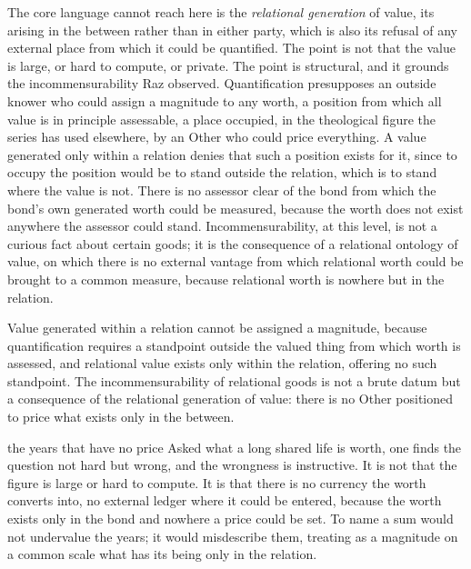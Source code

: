 The core language cannot reach here is the \emph{relational generation} of value, its arising in the between rather than in either party, which is also its refusal of any external place from which it could be quantified. The point is not that the value is large, or hard to compute, or private. The point is structural, and it grounds the incommensurability Raz observed. Quantification presupposes an outside knower who could assign a magnitude to any worth, a position from which all value is in principle assessable, a place occupied, in the theological figure the series has used elsewhere, by an Other who could price everything. A value generated only within a relation denies that such a position exists for it, since to occupy the position would be to stand outside the relation, which is to stand where the value is not. There is no assessor clear of the bond from which the bond's own generated worth could be measured, because the worth does not exist anywhere the assessor could stand. Incommensurability, at this level, is not a curious fact about certain goods; it is the consequence of a relational ontology of value, on which there is no external vantage from which relational worth could be brought to a common measure, because relational worth is nowhere but in the relation.

\begin{claim}
Value generated within a relation cannot be assigned a magnitude, because quantification requires a standpoint outside the valued thing from which worth is assessed, and relational value exists only within the relation, offering no such standpoint. The incommensurability of relational goods is not a brute datum but a consequence of the relational generation of value: there is no Other positioned to price what exists only in the between.
\end{claim}

\begin{casebox}{the years that have no price}
Asked what a long shared life is worth, one finds the question not hard but wrong, and the wrongness is instructive. It is not that the figure is large or hard to compute. It is that there is no currency the worth converts into, no external ledger where it could be entered, because the worth exists only in the bond and nowhere a price could be set. To name a sum would not undervalue the years; it would misdescribe them, treating as a magnitude on a common scale what has its being only in the relation.
\end{casebox}

